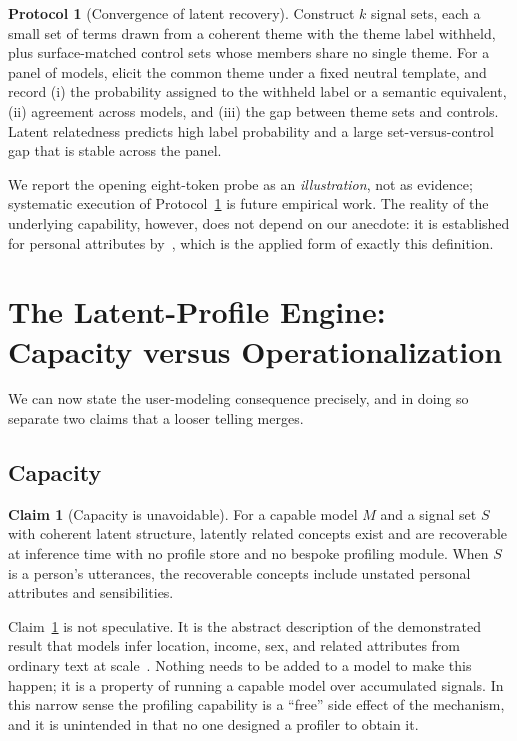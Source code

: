 \documentclass[conference]{IEEEtran}
\theoremstyle{definition}
\newtheorem{claim}{Claim}
\newtheorem{protocol}{Protocol}
\newcommand{\model}{M}
\newcommand{\sigset}{S}
\begin{document}
\begin{protocol}[Convergence of latent recovery]
\label{prot:conv}
Construct $k$ signal sets, each a small set of terms drawn from a coherent theme with the theme label withheld, plus surface-matched control sets whose members share no single theme. For a panel of models, elicit the common theme under a fixed neutral template, and record (i) the probability assigned to the withheld label or a semantic equivalent, (ii) agreement across models, and (iii) the gap between theme sets and controls. Latent relatedness predicts high label probability and a large set-versus-control gap that is stable across the panel.
\end{protocol}

We report the opening eight-token probe as an \emph{illustration}, not as evidence; systematic execution of Protocol~\ref{prot:conv} is future empirical work. The reality of the underlying capability, however, does not depend on our anecdote: it is established for personal attributes by~\cite{staab2024beyond}, which is the applied form of exactly this definition.

\section{The Latent-Profile Engine: Capacity versus Operationalization}
\label{sec:engine}

We can now state the user-modeling consequence precisely, and in doing so separate two claims that a looser telling merges.

\subsection{Capacity}
\begin{claim}[Capacity is unavoidable]
\label{clm:capacity}
For a capable model $\model$ and a signal set $\sigset$ with coherent latent structure, latently related concepts exist and are recoverable at inference time with no profile store and no bespoke profiling module. When $\sigset$ is a person's utterances, the recoverable concepts include unstated personal attributes and sensibilities.
\end{claim}
Claim~\ref{clm:capacity} is not speculative. It is the abstract description of the demonstrated result that models infer location, income, sex, and related attributes from ordinary text at scale~\cite{staab2024beyond}. Nothing needs to be added to a model to make this happen; it is a property of running a capable model over accumulated signals. In this narrow sense the profiling capability is a ``free'' side effect of the mechanism, and it is unintended in that no one designed a profiler to obtain it.
\end{document}
